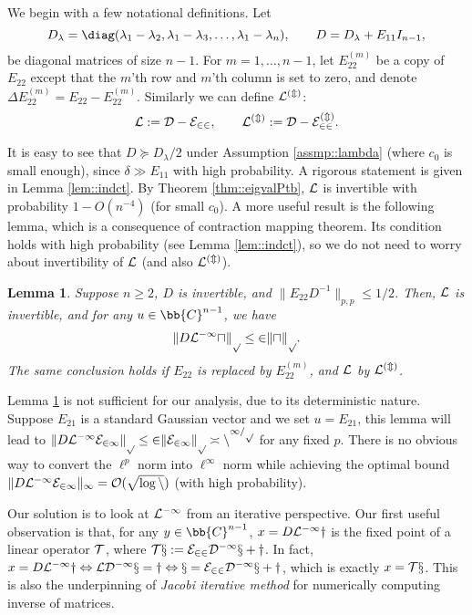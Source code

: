 \documentclass[12pt]{article}%
\theoremstyle{plain}%
\newtheorem{lem}{Lemma}[section]
\theoremstyle{remark}
\begin{document}
We begin with a few notational definitions. Let 
\begin{equation*}
D_\lambda = \diag(\lambda_1 - \lambda_2, \lambda_1  - \lambda_3, \ldots, \lambda_1   - \lambda_n), \qquad D = D_\lambda + E_{11} I_{n-1},
\end{equation*}
be diagonal matrices of size $n-1$. For $m = 1,\ldots, n-1$, let $E_{22}^{(m)}$ be a copy of $E_{22}$ except that the $m$'th row and $m$'th column is set to zero, and denote $\Delta E_{22}^{(m)} = E_{22} - E_{22}^{(m)}$. Similarly we can define $\cal{L}^{(m)}$:
\begin{equation*}
\cal{L} := D - E_{22}, \qquad \cal{L}^{(m)} := D - E_{22}^{(m)}.
\end{equation*}

It is easy to see that $D \succeq D_\lambda/2$ under Assumption \ref{assmp::lambda} (where $c_0$ is small enough), since $\delta \gg E_{11}$ with high probability. A rigorous statement is given in Lemma \ref{lem::indct}. By Theorem \ref{thm::eigvalPtb}, $\cal{L}$ is invertible with probability $1-O(n^{-4})$ (for small $c_0$). A more useful result is the following lemma, which is a consequence of contraction mapping theorem. Its condition holds with high probability (see Lemma \ref{lem::indct}), so we do not need to worry about invertibility of $\cal{L}$ (and also $\cal{L}^{(m)}$).

\begin{lem}\label{lem::L-1norm}
Suppose $n \ge 2$, $D$ is invertible, and $\| E_{22} D^{-1} \|_{p,p} \le 1/2$. Then, $\cal{L}$ is invertible, and for any $u \in \bb{C}^{n-1}$, we have 
\begin{equation*}
\| D \cal{L}^{-1} u \|_p \le 2\|u\|_p.
\end{equation*}
The same conclusion holds if $E_{22}$ is replaced by $E_{22}^{(m)}$, and $\cal{L}$ by $\cal{L}^{(m)}$.
\end{lem}

Lemma \ref{lem::L-1norm} is not sufficient for our analysis, due to its deterministic nature. Suppose $E_{21}$ is a standard Gaussian vector and we set $u = E_{21}$, this lemma will lead to $\| D \cal{L}^{-1} E_{21} \|_p \le 2\|E_{21} \|_p \asymp n^{1/p}$ for any fixed $p$. There is no obvious way to convert the $\ell^p$ norm into $\ell^\infty$ norm while achieving the optimal bound $\| D \cal{L}^{-1} E_{21} \|_\infty = O(\sqrt{\log n})$ (with high probability).

Our solution is to look at $\cal{L}^{-1}$ from an iterative perspective. Our first useful observation is that, for any $y \in \bb{C}^{n-1}$, $x = D\cal{L}^{-1} y$ is the fixed point of a linear operator $\cal{T}$, where $\cal{T}x := E_{22}D^{-1} x + y$. In fact, $x = D\cal{L}^{-1} y \Leftrightarrow \cal{L} D^{-1}x = y \Leftrightarrow x = E_{22}D^{-1}x + y$, which is exactly $x = \cal{T}x$. This is also the underpinning of \textit{Jacobi iterative method} for numerically computing inverse of matrices.
\end{document}
